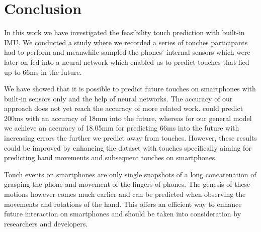 \section{Conclusion}
In this work we have investigated the feasibility touch prediction with built-in IMU. 
We conducted a study where we recorded a series of touches participants had to perform and meanwhile sampled the phones' internal sensors which were later on fed into a neural network which enabled us to predict touches that lied up to 66ms in the future.

We have showed that it is possible to predict future touches on smartphones with built-in sensors only  and the help of neural networks.
The accuracy of our approach does not yet reach the accuracy of more related work. \citeauthor{MohdNoor2016} \cite{MohdNoor2016} could predict 200ms with an accuracy of 18mm into the future, whereas for our general model we achieve an accuracy of 18.05mm for predicting 66ms into the future with increasing errors the further we predict away from touches.
However, these results could be improved by enhancing the dataset with touches specifically aiming for predicting hand movements and subsequent touches on smartphones.

Touch events on smartphones are only single snapshots of a long concatenation of grasping the phone and movement of the fingers of phones. 
The genesis of these motions however comes much earlier and can be predicted when observing the movements and rotations of the hand.
This offers an efficient way to enhance future interaction on smartphones and should be taken into consideration by researchers and developers.

